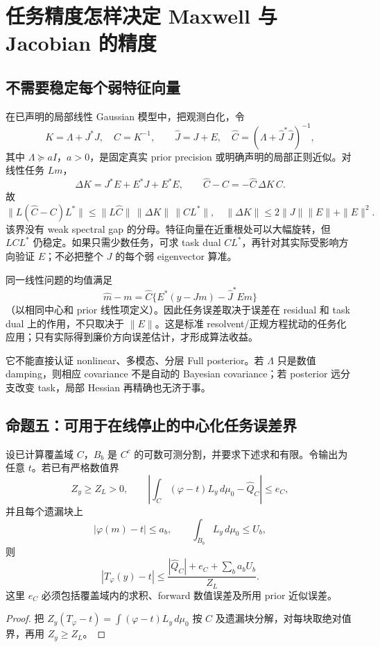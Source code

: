 \section{任务精度怎样决定 Maxwell 与 Jacobian 的精度}
\label{sec:accuracy}

\subsection{不需要稳定每个弱特征向量}
在已声明的局部线性 Gaussian 模型中，把观测白化，令
\[
K=\Lambda+J^*J,\quad C=K^{-1},\qquad
\widehat J=J+E,\quad \widehat C=(\Lambda+\widehat J^*\widehat J)^{-1},
\]
其中 $\Lambda\succeq aI$，$a>0$，是固定真实 prior precision 或明确声明的局部正则近似。对线性任务 $Lm$，
\[
\Delta K=J^*E+E^*J+E^*E,\qquad
\widehat C-C=-\widehat C\,\Delta K\,C.
\]
故
\begin{equation}
\|L(\widehat C-C)L^*\|
\le
\|L\widehat C\|\,\|\Delta K\|\,\|CL^*\|,
\quad
\|\Delta K\|\le 2\|J\|\|E\|+\|E\|^2.
\label{eq:task-cov-error}
\end{equation}
该界没有 weak spectral gap 的分母。特征向量在近重根处可以大幅旋转，但 $LC L^*$ 仍稳定。如果只需少数任务，可求 task dual $CL^*$，再针对其实际受影响方向验证 $E$；不必把整个 $J$ 的每个弱 eigenvector 算准。

同一线性问题的均值满足
\[
\widehat m-m=
\widehat C\{E^*(y-Jm)-\widehat J^*Em\}
\]
（以相同中心和 prior 线性项定义）。因此任务误差取决于误差在 residual 和 task dual 上的作用，不只取决于 $\|E\|$。这是标准 resolvent/正规方程扰动的任务化应用；只有实际得到廉价方向误差估计，才形成算法收益。

它不能直接认证 nonlinear、多模态、分层 Full posterior。若 $\Lambda$ 只是数值 damping，则相应 covariance 不是自动的 Bayesian covariance；若 posterior 远分支改变 task，局部 Hessian 再精确也无济于事。

\subsection{命题五：可用于在线停止的中心化任务误差界}
\begin{theorem}[中心化积分证书]
\label{thm:task-certificate}
设已计算覆盖域 $C$，$B_b$ 是 $C^c$ 的可数可测分割，并要求下述求和有限。令输出为任意 $t$。若已有严格数值界
\[
Z_y\ge Z_L>0,\qquad
\left|\int_C(\varphi-t)L_y\,d\mu_0-\widehat Q_C\right|\le e_C,
\]
并且每个遗漏块上
\[
|\varphi(m)-t|\le a_b,\qquad
\int_{B_b}L_y\,d\mu_0\le U_b,
\]
则
\begin{equation}
|T_\varphi(y)-t|
\le
\frac{|\widehat Q_C|+e_C+\sum_ba_bU_b}{Z_L}.
\label{eq:centered-certificate}
\end{equation}
这里 $e_C$ 必须包括覆盖域内的求积、forward 数值误差及所用 prior 近似误差。
\end{theorem}
\begin{proof}
把 $Z_y(T_\varphi-t)=\int(\varphi-t)L_y\,d\mu_0$ 按 $C$ 及遗漏块分解，对每块取绝对值界，再用 $Z_y\ge Z_L$。
\end{proof}

